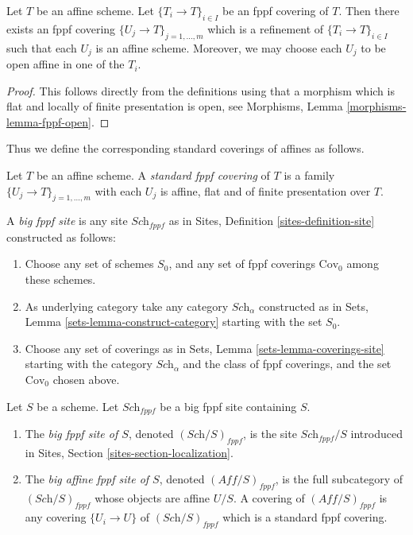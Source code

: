 \begin{lemma}
\label{lemma-fppf-affine}
Let $T$ be an affine scheme.
Let $\{T_i \to T\}_{i \in I}$ be an fppf covering of $T$.
Then there exists an fppf covering
$\{U_j \to T\}_{j = 1, \ldots, m}$ which is a refinement
of $\{T_i \to T\}_{i \in I}$ such that each $U_j$ is an affine
scheme. Moreover, we may choose each $U_j$ to be open affine
in one of the $T_i$.
\end{lemma}

\begin{proof}
This follows directly from the definitions using that a
morphism which is flat and locally of finite presentation is open,
see Morphisms, Lemma \ref{morphisms-lemma-fppf-open}.
\end{proof}

\noindent
Thus we define the corresponding standard coverings of affines as follows.

\begin{definition}
\label{definition-standard-fppf}
Let $T$ be an affine scheme. A {\it standard fppf covering}
of $T$ is a family $\{U_j \to T\}_{j = 1, \ldots, m}$
with each $U_j$ is affine, flat and of finite presentation over $T$.
\end{definition}

\begin{definition}
\label{definition-big-fppf-site}
A {\it big fppf site} is any site $\textit{Sch}_{fppf}$ as in
Sites, Definition \ref{sites-definition-site} constructed as follows:
\begin{enumerate}
\item Choose any set of schemes $S_0$, and any set of fppf coverings
$\text{Cov}_0$ among these schemes.
\item As underlying category take any category $\textit{Sch}_\alpha$
constructed as in Sets, Lemma \ref{sets-lemma-construct-category}
starting with the set $S_0$.
\item Choose any set of coverings as in
Sets, Lemma \ref{sets-lemma-coverings-site} starting with the
category $\textit{Sch}_\alpha$ and the class of fppf coverings,
and the set $\text{Cov}_0$ chosen above.
\end{enumerate}
\end{definition}

\begin{definition}
\label{definition-big-small-fppf}
Let $S$ be a scheme. Let $\textit{Sch}_{fppf}$ be a big fppf
site containing $S$.
\begin{enumerate}
\item The {\it big fppf site of $S$}, denoted
$(\textit{Sch}/S)_{fppf}$, is the site $\textit{Sch}_{fppf}/S$
introduced in Sites, Section \ref{sites-section-localization}.
\item The {\it big affine fppf site of $S$}, denoted
$(\textit{Aff}/S)_{fppf}$, is the full subcategory of
$(\textit{Sch}/S)_{fppf}$ whose objects are affine $U/S$.
A covering of $(\textit{Aff}/S)_{fppf}$ is any covering
$\{U_i \to U\}$ of $(\textit{Sch}/S)_{fppf}$ which is a
standard fppf covering.
\end{enumerate}
\end{definition}

